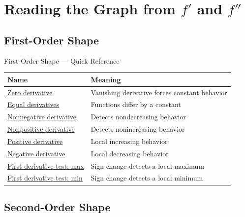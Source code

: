 \section{\texorpdfstring{Reading the Graph from \(f'\) and \(f''\)}{Reading the Graph from f' and f''}}

\subsection{First-Order Shape}

\begin{toolkitbox}{First-Order Shape --- Quick Reference}
\small
\begin{tabular}{l l}
\toprule
\textbf{Name} & \textbf{Meaning} \\
\midrule
\hyperref[thm:zero-derivative-implies-constant]{Zero derivative} & Vanishing derivative forces constant behavior \\
\hyperref[cor:equal-derivatives-constant-difference]{Equal derivatives} & Functions differ by a constant \\
\hyperref[thm:nondecreasing-iff-nonneg-derivative]{Nonnegative derivative} & Detects nondecreasing behavior \\
\hyperref[thm:nonincreasing-iff-nonpos-derivative]{Nonpositive derivative} & Detects nonincreasing behavior \\
\hyperref[lem:positive-derivative-implies-locally-increasing]{Positive derivative} & Local increasing behavior \\
\hyperref[lem:negative-derivative-implies-locally-decreasing]{Negative derivative} & Local decreasing behavior \\
\hyperref[thm:first-derivative-test-maximum]{First derivative test: max} & Sign change detects a local maximum \\
\hyperref[thm:first-derivative-test-minimum]{First derivative test: min} & Sign change detects a local minimum \\
\bottomrule
\end{tabular}
\end{toolkitbox}



\subsection{Second-Order Shape}

